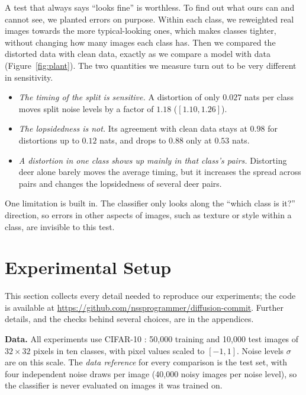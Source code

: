 \documentclass[11pt]{article}
\newcommand{\para}[1]{\textbf{#1}\hspace{0.6em}}
\begin{document}
A test that always says ``looks fine'' is worthless. To find out what ours can and cannot see, we planted errors on purpose. Within each class, we reweighted real images towards the more typical-looking ones, which makes classes tighter, without changing how many images each class has. Then we compared the distorted data with clean data, exactly as we compare a model with data (Figure~\ref{fig:plant}). The two quantities we measure turn out to be very different in sensitivity.
\begin{itemize}[leftmargin=*]
\item \emph{The timing of the split is sensitive.} A distortion of only $0.027$ nats per class moves split noise levels by a factor of $1.18$ ($[1.10,1.26]$).
\item \emph{The lopsidedness is not.} Its agreement with clean data stays at $0.98$ for distortions up to $0.12$ nats, and drops to $0.88$ only at $0.53$ nats.
\item \emph{A distortion in one class shows up mainly in that class's pairs.} Distorting deer alone barely moves the average timing, but it increases the spread across pairs and changes the lopsidedness of several deer pairs.
\end{itemize}
One limitation is built in. The classifier only looks along the ``which class is it?'' direction, so errors in other aspects of images, such as texture or style within a class, are invisible to this test.

\section{Experimental Setup}
\label{sec:setup}

This section collects every detail needed to reproduce our experiments; the code is available at \url{https://github.com/nssprogrammer/diffusion-commit}. Further details, and the checks behind several choices, are in the appendices.

\para{Data.}
All experiments use CIFAR-10 \citep{krizhevsky2009learning}: 50{,}000 training and 10{,}000 test images of $32\times32$ pixels in ten classes, with pixel values scaled to $[-1,1]$. Noise levels $\sigma$ are on this scale. The \emph{data reference} for every comparison is the test set, with four independent noise draws per image (40{,}000 noisy images per noise level), so the classifier is never evaluated on images it was trained on.
\end{document}
